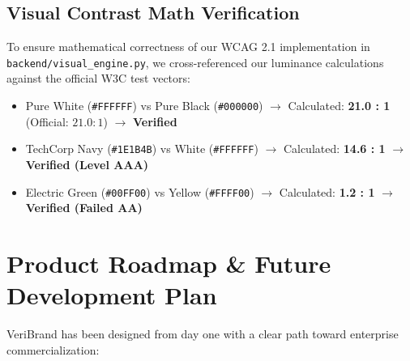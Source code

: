 \documentclass[11pt,a4paper]{article}
\begin{document}
\subsection{Visual Contrast Math Verification}
To ensure mathematical correctness of our WCAG 2.1 implementation in \texttt{backend/visual\_engine.py}, we cross-referenced our luminance calculations against the official W3C test vectors:
\begin{itemize}[leftmargin=1cm]
    \item Pure White (\texttt{\#FFFFFF}) vs Pure Black (\texttt{\#000000}) $\rightarrow$ Calculated: \textbf{21.0 : 1} (Official: $21.0:1$) $\rightarrow$ \textcolor{successgreen}{\textbf{Verified}}
    \item TechCorp Navy (\texttt{\#1E1B4B}) vs White (\texttt{\#FFFFFF}) $\rightarrow$ Calculated: \textbf{14.6 : 1} $\rightarrow$ \textcolor{successgreen}{\textbf{Verified (Level AAA)}}
    \item Electric Green (\texttt{\#00FF00}) vs Yellow (\texttt{\#FFFF00}) $\rightarrow$ Calculated: \textbf{1.2 : 1} $\rightarrow$ \textcolor{dangerred}{\textbf{Verified (Failed AA)}}
\end{itemize}

\newpage

\section{Product Roadmap \& Future Development Plan}

VeriBrand has been designed from day one with a clear path toward enterprise commercialization:
\end{document}
